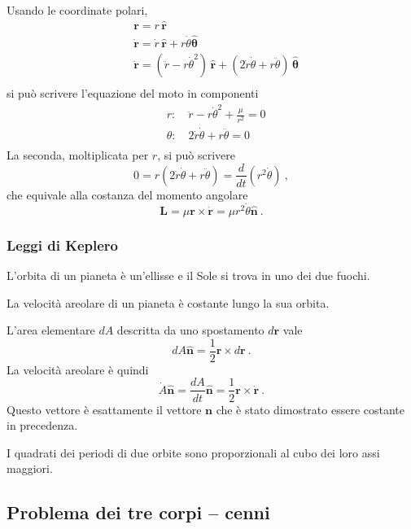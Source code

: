 \noindent
Usando le coordinate polari,
\begin{equation}
\begin{aligned}
    & \mathbf{r} = r \, \mathbf{\hat{r}} \\
    & \dot{\mathbf{r}} = \dot{r} \, \mathbf{\hat{r}} + r \dot{\theta} \boldsymbol{\hat{\theta}} \\
    & \ddot{\mathbf{r}} = \left( \ddot{r} - r \dot{\theta}^2 \right) \, \mathbf{\hat{r}} + \left( 2 \dot{r} \dot{\theta} + r \ddot{\theta} \right) \, \boldsymbol{\hat{\theta}} \\
\end{aligned}
\end{equation}
si può scrivere l'equazione del moto in componenti
\begin{equation}
\begin{aligned}
    & r:      \quad \ddot{r} - r \dot{\theta}^2 + \frac{\mu}{r^2} = 0 \\
    & \theta: \quad 2 \dot{r} \dot{\theta} + r \ddot{\theta} = 0 \\
\end{aligned}
\end{equation}
La seconda, moltiplicata per $r$, si può scrivere
\begin{equation}
    0 = r \left( 2 \dot{r} \dot{\theta} + r \ddot{\theta}\right) = \dfrac{d}{dt} \left( r^2 \dot{\theta} \right ) \ ,
\end{equation}
che equivale alla costanza del momento angolare
\begin{equation}
    \mathbf{L} = \mu \mathbf{r} \times \dot{\mathbf{r}} = \mu r^2 \dot{\theta} \mathbf{\hat{n}} \ .
\end{equation}

\subsubsection{Leggi di Keplero}
\begin{theorem} L'orbita di un pianeta è un'ellisse e il Sole si trova in uno dei due fuochi.
\end{theorem}
\begin{theorem} La velocità areolare di un pianeta è costante lungo la sua orbita.
\end{theorem}
L'area elementare $dA$ descritta da uno spostamento $d \mathbf{r}$ vale
\begin{equation}
   d A \mathbf{\hat{n}} = \frac{1}{2} \mathbf{r} \times d \mathbf{r} \ .
\end{equation}
La velocità areolare è quindi
\begin{equation}
    \dot{A} \mathbf{\hat{n}} = \dfrac{d A}{d t} \mathbf{\hat{n}} = \dfrac{1}{2} \mathbf{r} \times \dot{\mathbf{r}} \ .
\end{equation}
Questo vettore è esattamente il vettore $\mathbf{n}$ che è stato dimostrato essere costante in precedenza.


\begin{theorem} I quadrati dei periodi di due orbite sono proporzionali al cubo dei loro assi maggiori.
\end{theorem}

\subsection{Problema dei tre corpi -- cenni}


